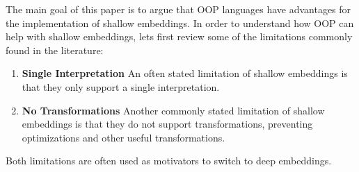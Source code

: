 \begin{comment}
If we accept Cook's view on OOP, 
a natural way to distinguish implementations of EDSLs is 
in terms of the data abstraction used to model the language
constructs instead. As Reynold's~\cite{reynolds94proceduralabstraction} suggested there are two
types of data abstraction: procedural abstraction and \emph{user-defined
  types}. It is clear that shallow embeddings use \emph{procedural
  abstraction}: the DSLs are modelled by interpretation
functions. Thus, the other implementation option for EDSLs is to
use \emph{user-defined types}. In Reynolds terminology user-defined
types mean disjoint union types, which are nowadays commonly available
in modern languages as \emph{algebraic datatypes}. Disjoint union
types can also be emulated in OOP using the {\sc Visitor} pattern. 

A distinction based on data abstraction is more precise and provides a
remedy for possible misinterpretation. An EDSL implemented with
algebraic datatypes falls into the category of user-defined types
(deep embedding), while a {\sc Composite}-based OO implementation falls
under procedural abstraction (shallow embedding). 
\end{comment}


The main goal of this paper is to argue that OOP languages have
advantages for the implementation of shallow embeddings. 
In order to understand how OOP can help with shallow embeddings, lets
first review some of the limitations commonly
found in the literature:

\begin{enumerate}

\item {\bf Single Interpretation} An often stated limitation of
  shallow embeddings is that they only support a single
  interpretation.

\item {\bf No Transformations} Another commonly stated limitation 
of shallow embeddings is that they do not support transformations,
preventing optimizations and other useful transformations.

\end{enumerate}

\noindent Both limitations are often used as motivators to switch to deep embeddings.

